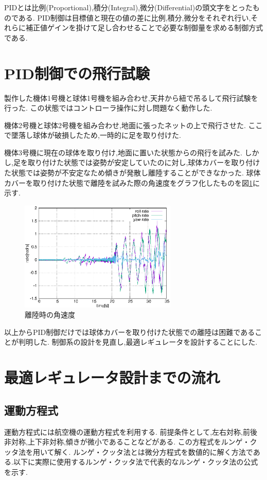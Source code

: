 \documentclass[12pt,oneside]{sotsuken_paper}
\begin{document}
PIDとは比例(Proportional),積分(Integral),微分(Differential)の頭文字をとったものである.
PID制御は目標値と現在の値の差に比例,積分,微分をそれぞれ行い,それらに補正値ゲインを掛けて足し合わせることで必要な制御量を求める制御方式である.\cite{pid}

\section{PID制御での飛行試験}
製作した機体1号機と球体1号機を組み合わせ,天井から紐で吊るして飛行試験を行った.
この状態ではコントローラ操作に対し問題なく動作した.

機体2号機と球体2号機を組み合わせ,地面に張ったネットの上で飛行させた.
ここで墜落し球体が破損したため,一時的に足を取り付けた.

機体3号機に現在の球体を取り付け,地面に置いた状態からの飛行を試みた.
しかし,足を取り付けた状態では姿勢が安定していたのに対し,球体カバーを取り付けた状態では姿勢が不安定なため傾きが発散し離陸することができなかった.
球体カバーを取り付けた状態で離陸を試みた際の角速度をグラフ化したものを図\ref{fig:test-1}に示す.

\begin{figure}[htbp]
	\begin{center}
		\includegraphics[width=75mm]{image/test-1.eps}
		\caption{離陸時の角速度}
		\label{fig:test-1}
	\end{center}
\end{figure}

以上からPID制御だけでは球体カバーを取り付けた状態での離陸は困難であることが判明した.
制御系の設計を見直し,最適レギュレータを設計することにした.

\section{最適レギュレータ設計までの流れ}

\subsection{運動方程式}
運動方程式には航空機の運動方程式を利用する.
前提条件として,左右対称,前後非対称,上下非対称,傾きが微小であることなどがある.
この方程式をルンゲ・クッタ法を用いて解く.
ルンゲ・クッタ法とは微分方程式を数値的に解く方法である.以下に実際に使用するルンゲ・クッタ法で代表的なルンゲ・クッタ法の公式を示す.
\end{document}
